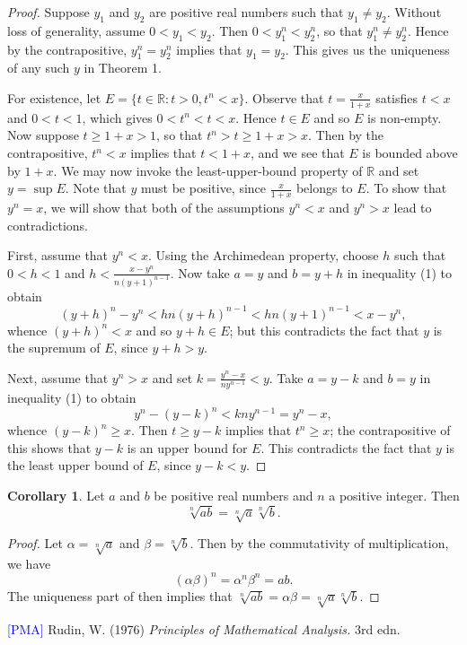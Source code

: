 \documentclass[12pt]{article}
\theoremstyle{definition}
\newtheorem{corollary}[theorem]{Corollary}
\begin{document}
\begin{proof}
    Suppose \( y_1 \) and \( y_2 \) are positive real numbers such that \( y_1 \neq y_2 \). Without loss of generality, assume \( 0 < y_1 < y_2 \). Then \( 0 < y_1^n < y_2^n \), so that \( y_1^n \neq y_2^n \). Hence by the contrapositive, \( y_1^n = y_2^n \) implies that \( y_1 = y_2 \). This gives us the uniqueness of any such \( y \) in Theorem 1.
    
    For existence, let \( E = \{ t \in \mathbb{R} : t > 0, t^n < x \} \). Observe that \( t = \frac{x}{1 + x} \) satisfies \( t < x \) and \( 0 < t < 1 \), which gives \( 0 < t^n < t < x \). Hence \( t \in E \) and so \( E \) is non-empty. Now suppose \( t \geq 1 + x > 1 \), so that \( t^n > t \geq 1 + x > x \). Then by the contrapositive, \( t^n < x \) implies that \( t < 1 + x \), and we see that \( E \) is bounded above by \( 1 + x \). We may now invoke the least-upper-bound property of \( \mathbb{R} \) and set \( y = \sup E \). Note that \( y \) must be positive, since \( \frac{x}{1 + x} \) belongs to \( E \). To show that \( y^n = x \), we will show that both of the assumptions \( y^n < x \) and \( y^n > x \) lead to contradictions.
    
    First, assume that \( y^n < x \). Using the Archimedean property, choose \( h \) such that \( 0 < h < 1 \) and \( h < \frac{x - y^n}{n (y+1)^{n-1}} \). Now take \( a = y \) and \( b = y + h \) in inequality (1) to obtain
    \[
    (y + h)^n - y^n < h n (y + h)^{n-1} < h n (y + 1)^{n-1} < x - y^n,
    \]
    whence \( (y + h)^n < x \) and so \( y + h \in E \); but this contradicts the fact that \( y \) is the supremum of \( E \), since \( y + h > y \).
    
    Next, assume that \( y^n > x \) and set \( k = \frac{y^n - x}{ny^{n-1}} < y \). Take \( a = y - k \) and \( b = y \) in inequality (1) to obtain
    \[
    y^n - (y - k)^n < kny^{n-1} = y^n - x,
    \]
    whence \( (y - k)^n \geq x \). Then \( t \geq y - k \) implies that \( t^n \geq x \); the contrapositive of this shows that \( y - k \) is an upper bound for \( E \). This contradicts the fact that \( y \) is the least upper bound of \( E \), since \( y - k < y \).
\end{proof}

\begin{corollary}
\label{cor:exponent_rule}
    Let \( a \) and \( b \) be positive real numbers and \( n \) a positive integer. Then
    \[
    \sqrt[n]{ab} = \sqrt[n]{a}\sqrt[n]{b}.
    \]
\end{corollary}

\begin{proof}
    Let \( \alpha = \sqrt[n]{a} \) and \( \beta = \sqrt[n]{b} \). Then by the commutativity of multiplication, we have
    \[
    (\alpha \beta)^n = \alpha^n \beta^n = ab.
    \]
    The uniqueness part of  then implies that \( \sqrt[n]{ab} = \alpha \beta = \sqrt[n]{a} \sqrt[n]{b} \).
\end{proof}

\noindent \hrulefill

\noindent \hypertarget{pma}{\textcolor{blue}{[PMA]} Rudin, W. (1976) \textit{Principles of Mathematical Analysis.} 3rd edn.}
\end{document}
